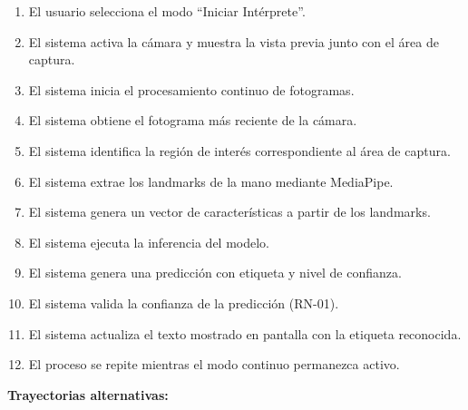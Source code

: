 	\begin{enumerate}
		\item El usuario selecciona el modo ``Iniciar Intérprete''.
		\item El sistema activa la cámara y muestra la vista previa junto con el área de captura.
		\item El sistema inicia el procesamiento continuo de fotogramas.
		\item El sistema obtiene el fotograma más reciente de la cámara.
		\item El sistema identifica la región de interés correspondiente al área de captura.
		\item El sistema extrae los landmarks de la mano mediante MediaPipe.
		\item El sistema genera un vector de características a partir de los landmarks.
		\item El sistema ejecuta la inferencia del modelo.
		\item El sistema genera una predicción con etiqueta y nivel de confianza.
		\item El sistema valida la confianza de la predicción (RN-01).
		\item El sistema actualiza el texto mostrado en pantalla con la etiqueta reconocida.
		\item El proceso se repite mientras el modo continuo permanezca activo.
		
	\end{enumerate}
	
	\textbf{Trayectorias alternativas:}
	
